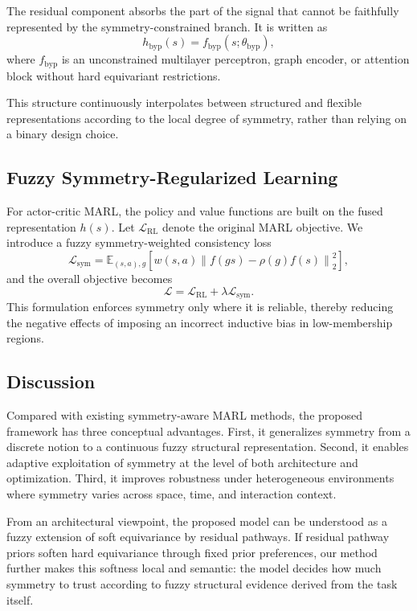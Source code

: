 \documentclass[lettersize,journal]{IEEEtran}
\newcommand{\E}{\mathbb{E}}
\newcommand{\Acal}{\mathcal}
\newcommand{\sym}{\mathrm{sym}}
\newcommand{\bypass}{\mathrm{byp}}
\begin{document}
The residual component absorbs the part of the signal that cannot be faithfully represented by the symmetry-constrained branch. It is written as
\[
h_{\bypass}(s)=f_{\bypass}(s;\theta_{\bypass}),
\]
where $f_{\bypass}$ is an unconstrained multilayer perceptron, graph encoder, or attention block without hard equivariant restrictions.

This structure continuously interpolates between structured and flexible representations according to the local degree of symmetry, rather than relying on a binary design choice.

\subsection{Fuzzy Symmetry-Regularized Learning}
For actor-critic MARL, the policy and value functions are built on the fused representation $h(s)$. Let $\Acal{L}_{\mathrm{RL}}$ denote the original MARL objective. We introduce a fuzzy symmetry-weighted consistency loss
\begin{equation}
\Acal{L}_{\sym}
=
\E_{(s,a),g}
\left[
w(s,a)\left\|
f(gs)-\rho(g)f(s)
\right\|_2^2
\right],
\label{eq:loss-sym}
\end{equation}
and the overall objective becomes
\begin{equation}
\Acal{L}
=
\Acal{L}_{\mathrm{RL}} + \lambda \Acal{L}_{\sym}.
\label{eq:loss}
\end{equation}
This formulation enforces symmetry only where it is reliable, thereby reducing the negative effects of imposing an incorrect inductive bias in low-membership regions.

\subsection{Discussion}
Compared with existing symmetry-aware MARL methods, the proposed framework has three conceptual advantages. First, it generalizes symmetry from a discrete notion to a continuous fuzzy structural representation. Second, it enables adaptive exploitation of symmetry at the level of both architecture and optimization. Third, it improves robustness under heterogeneous environments where symmetry varies across space, time, and interaction context.

From an architectural viewpoint, the proposed model can be understood as a fuzzy extension of soft equivariance by residual pathways. If residual pathway priors soften hard equivariance through fixed prior preferences, our method further makes this softness local and semantic: the model decides how much symmetry to trust according to fuzzy structural evidence derived from the task itself.
\end{document}
